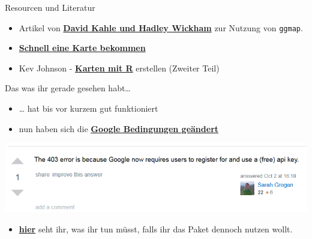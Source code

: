 \documentclass[ignorenonframetext,]{beamer}
\providecommand{\tightlist}{%
  \setlength{\itemsep}{0pt}\setlength{\parskip}{0pt}}
\begin{document}
\begin{frame}[fragile]{Resourcen und Literatur}
\protect\hypertarget{resourcen-und-literatur}{}

\begin{itemize}
\item
  Artikel von
  \href{http://journal.r-project.org/archive/2013-1/kahle-wickham.pdf}{\textbf{David
  Kahle und Hadley Wickham}} zur Nutzung von \texttt{ggmap}.
\item
  \href{http://rpackages.ianhowson.com/cran/ggmap/man/get_map.html}{\textbf{Schnell
  eine Karte bekommen}}
\item
  Kev Johnson -
  \href{http://www.kevjohnson.org/making-maps-in-r-part-2/}{\textbf{Karten
  mit R}} erstellen (Zweiter Teil)
\end{itemize}

\end{frame}

\begin{frame}{Das was ihr gerade gesehen habt\ldots{}}
\protect\hypertarget{das-was-ihr-gerade-gesehen-habt}{}

\begin{itemize}
\tightlist
\item
  \ldots{} hat bis vor kurzem gut funktioniert
\item
  nun haben sich die
  \href{https://stackoverflow.com/questions/19827598/error-in-get-map-using-ggmap-in-r}{\textbf{Google
  Bedingungen geändert}}
\end{itemize}

\includegraphics{figure/Google_error.PNG}

\begin{itemize}
\tightlist
\item
  \href{https://github.com/dkahle/ggmap/issues/83}{\textbf{hier}} seht
  ihr, was ihr tun müsst, falls ihr das Paket dennoch nutzen wollt.
\end{itemize}

\end{frame}
\end{document}
